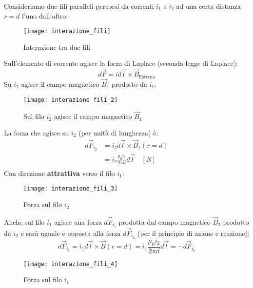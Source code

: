 \documentclass[a4paper]{article}
\begin{document}
\begin{example}
  Consideriamo due fili paralleli percorsi da correnti \( i_1 \) e \( i_2 \) ad
  una certa distanza \( r = d \) l'uno dall'altro:
  \begin{figure}[H]
    \centering
    \texttt{[image: interazione\_fili]}
    \caption{Interazione tra due fili}
  \end{figure}
  \noindent
  Sull'elemento di corrente agisce la forza di Laplace (seconda legge di Laplace):
  \[
    d\vec{F} = i d\vec{l} \times \vec{B}_{\text{Esterno}}
  \] 
  Su \( i_2 \) agisce il campo magnetico \( \vec{B}_1 \) prodotto da \( i_1 \):
  \begin{figure}[H]
    \centering
    \texttt{[image: interazione\_fili\_2]}
    \caption{Sul filo \( i_2 \) agisce il campo magnetico \( \vec{B}_1 \)}
  \end{figure}
  \noindent
  La forza che agisce su \( i_2 \) (per unità di lunghezza) è:
  \[
    \begin{aligned}
      d\vec{F}_{i_2} &= i_2 d\vec{l} \times \vec{B}_1(r = d)\\
                     &= i_2 \frac{\mu_0 i_1}{2 \pi d} d\vec{l} \quad \left[ N \right] \\
    \end{aligned}
  \]
  Con direzione \textbf{attrattiva} verso il filo \( i_1 \):
  \begin{figure}[H]
    \centering
    \texttt{[image: interazione\_fili\_3]}
    \caption{Forza sul filo \( i_2 \)}
  \end{figure}
  \noindent
  Anche sul filo \( i_1 \) agisce una forza \( d\vec{F}_{i_1} \) prodotta dal campo
  magnetico \( \vec{B}_2 \) prodotto da \( i_2 \) e sarà uguale e opposta alla forza
  \( d\vec{F}_{i_2} \) (per il principio di azione e reazione):
  \[
    d\vec{F}_{i_1} = i_1 d\vec{l} \times \vec{B}(r = d) = i_1 \frac{\mu_0 i_2}{2 \pi d} d\vec{l}
    = -d\vec{F}_{i_2}
  \]
  \begin{figure}[H]
    \centering
    \texttt{[image: interazione\_fili\_4]}
    \caption{Forza sul filo \( i_1 \)}
  \end{figure}
\end{example}
\end{document}
